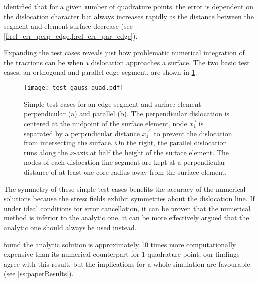 \citet{analytic_tractions} identified that for a given number of quadrature points, the error is dependent on the dislocation character but always increases rapidly as the distance between the segment and element surface decrease (see \cref{f:rel_err_perp_edge,f:rel_err_par_edge}).

Expanding the test cases reveals just how problematic numerical integration of the tractions can be when a dislocation approaches a surface. The two basic test cases, an orthogonal and parallel edge segment, are shown in \cref{f:gauss_quad_test}.
\begin{figure}
    \centering
    \texttt{[image: test\_gauss\_quad.pdf]}
    \caption[Test cases for comparing numeric v.s. analytic tractions using an edge dislocation near a surface.]{Simple test cases for an edge segment and surface element perpendicular (a) and parallel (b). The perpendicular dislocation is centered at the midpoint of the surface element, node $\vec{x_1}$ is separated by a perpendicular distance $\vec{x_1}^z$ to prevent the dislocation from intersecting the surface. On the right, the parallel dislocation runs along the $x$-axis at half the height of the surface element. The nodes of each dislocation line segment are kept at a perpendicular distance of at least one core radius away from the surface element.}
    \label{f:gauss_quad_test}
\end{figure}

The symmetry of these simple test cases benefits the accuracy of the numerical solutions because the stress fields exhibit symmetries about the dislocation line. If under ideal conditions for error cancellation, it can be proven that the numerical method is inferior to the analytic one, it can be more effectively argued that the analytic one should always be used instead.

\citet{analytic_tractions} found the analytic solution is approximately 10 times more computationally expensive than its numerical counterpart for 1 quadrature point, our findings agree with this result, but the implications for a whole simulation are favourable (see \cref{ss:paperResults}).


